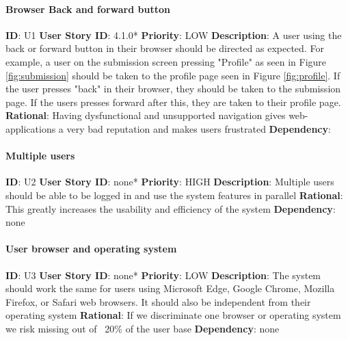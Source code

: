 \documentclass{article}
\begin{document}
\paragraph{Browser Back and forward button}\label{req:}
\textbf{ID}: U1\newline
\textbf{User Story ID}: 4.1.0* \newline
\textbf{Priority}: LOW\newline
\textbf{Description}: A user using the back or forward button in their browser should be directed as expected. For example, a user on the submission screen pressing "Profile" as seen in Figure \ref{fig:submission} should be taken to the profile page seen in Figure \ref{fig:profile}. If the user presses "back" in their browser, they should be taken to the submission page. If the users presses forward after this, they are taken to their profile page.\newline
\textbf{Rational}: Having dysfunctional and unsupported navigation gives web-applications a very bad reputation and makes users frustrated\newline
\textbf{Dependency}: \label{req:profileDetails}\newline

\paragraph{Multiple users}\label{req:}
\textbf{ID}: U2\newline
\textbf{User Story ID}: none* \newline
\textbf{Priority}: HIGH\newline
\textbf{Description}: Multiple users should be able to be logged in and use the system features in parallel\newline
\textbf{Rational}: This greatly increases the usability and efficiency of the system\newline
\textbf{Dependency}: none\newline

\paragraph{User browser and operating system}\label{req:}
\textbf{ID}: U3\newline
\textbf{User Story ID}: none* \newline
\textbf{Priority}: LOW\newline
\textbf{Description}: The system should work the same for users using Microsoft Edge, Google Chrome, Mozilla Firefox, or Safari web browsers. It should also be independent from their operating system\newline
\textbf{Rational}: If we discriminate one browser or operating system we risk missing out of ~20\% of the user base\newline
\textbf{Dependency}: none\newline
\end{document}

